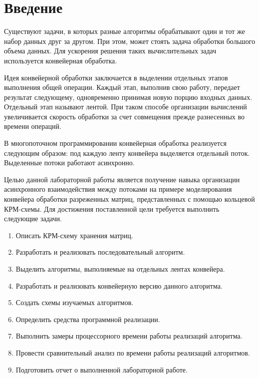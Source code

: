\chapter*{Введение}

Существуют задачи, в которых разные алгоритмы обрабатывают один и тот же набор данных друг за другом. При этом, может стоять задача обработки большого объема данных. Для ускорения решения таких вычислительных задач используется конвейерная обработка.

Идея конвейерной обработки \cite{idea} заключается в выделении отдельных этапов выполнения общей операции. Каждый этап, выполнив свою работу, передает результат следующему, одновременно принимая новую порцию входных данных. Отдельный этап называют лентой. При таком способе организации вычислений увеличивается скорость обработки за счет совмещения прежде разнесенных во времени операций.

В многопоточном программировании конвейерная обработка реализуется следующим образом: под каждую ленту конвейера выделяется отдельный поток. Выделенные потоки работают асинхронно.

Целью данной лабораторной работы является получение навыка организации асинхронного взаимодействия между потоками на примере моделирования конвейера обработки разреженных матриц, представленных с помощью кольцевой КРМ-схемы. Для достижения поставленной цели требуется выполнить следующие задачи.

\begin{enumerate}
	\item Описать КРМ-схему хранения матриц.
	\item Разработать и реализовать последовательный алгоритм.
	\item Выделить алгоритмы, выполняемые на отдельных лентах конвейера.
	\item Разработать и реализовать конвейерную версию данного алгоритма.
	\item Создать схемы изучаемых алгоритмов.
	\item Определить средства программной реализации.
	\item Выполнить замеры процессорного времени работы реализаций алгоритма.
	\item Провести сравнительный анализ по времени работы реализаций алгоритмов.
	\item Подготовить отчет о выполненной лабораторной работе.
\end{enumerate}